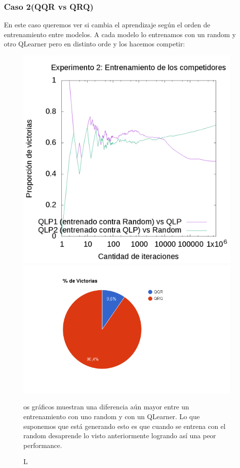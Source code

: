 \documentclass[10pt, a4paper]{article}
\begin{document}
\subsubsection{Caso 2(QQR vs QRQ)}


En este caso queremos ver si cambia el aprendizaje según el orden de entrenamiento entre modelos. A cada modelo lo entrenamos con un random y otro QLearner pero en distinto orde y los hacemos competir:


\begin{figure}[H]
  \begin{minipage}[c]{1\textwidth}
  \includegraphics[scale=0.2]{E2train.png}
  \includegraphics[scale=0.3]{QQRvsQRQ.png}
  {\caption Los gráficos muestran una diferencia aún mayor entre un entrenamiento con uno random y con un QLearner. Lo que suponemos que está generando esto es que cuando se entrena con el random desaprende lo visto anteriormente logrando así una peor performance.}
  \end{minipage}
\end{figure}
\end{document}
